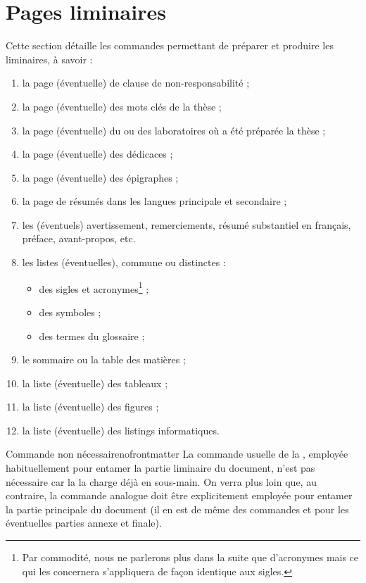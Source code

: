 \chapter{Pages liminaires}\label{cha:liminaires}

Cette section détaille les commandes permettant de préparer et produire les
\glspl{liminaire}, à savoir :
\begin{enumerate}
\item la page (éventuelle) de clause de non-responsabilité ;
\item la page (éventuelle) des mots clés de la thèse ;
\item la page (éventuelle) du ou des laboratoires où a été préparée la thèse ;
\item la page (éventuelle) des dédicaces ;
\item la page (éventuelle) des épigraphes ;
\item la page de résumés dans les langues principale et secondaire ;
\item les (éventuels) avertissement, remerciements, résumé substantiel en
  français, préface, avant-propos, etc.
\item les listes (éventuelles), commune ou distinctes :
  \begin{itemize}
  \item des sigles et acronymes\footnote{Par commodité, nous ne parlerons plus
      dans la suite que d'acronymes mais ce qui les concernera s'appliquera de
      façon identique aux sigles.} ;
  \item des symboles ;
  \item des termes du glossaire ;
  \end{itemize}
\item le sommaire ou la table des matières ;
\item la liste (éventuelle) des tableaux ;
\item la liste (éventuelle) des figures ;
\item la liste (éventuelle) des listings informatiques.
\end{enumerate}

\begin{dbremark}{Commande \protect{} non nécessaire}{nofrontmatter}
  La commande  usuelle de la , employée
  habituellement pour entamer la partie liminaire du document, n'est pas
  nécessaire car la \yatcl{} la charge déjà en sous-main. On verra plus loin
  que, au contraire, la commande analogue  doit être
  explicitement employée pour entamer la partie principale du document (il en
  est de même des commandes  et  pour les
  éventuelles parties annexe et finale).
\end{dbremark}

